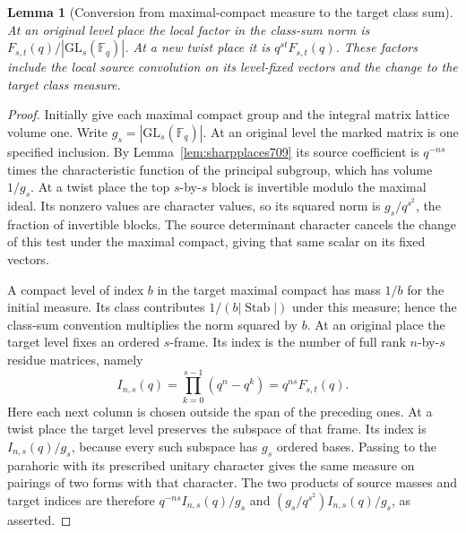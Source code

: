 \documentclass[a4paper,11pt]{article}
\newtheorem{lemma}[proposition]{Lemma}
\theoremstyle{definition}
\theoremstyle{remark}
\numberwithin{equation}{section}
\begin{document}
\begin{lemma}[Conversion from maximal-compact measure to the target class sum]
\leavevmode\label{lem:auxmass805}
At an original level place the local factor in the class-sum
norm is \(F_{s,t}(q)/|\mathrm{GL}_s(\mathbb F_q)|\).
At a new twist place it is \(q^{st}F_{s,t}(q)\).
These factors include the local source convolution on its
level-fixed vectors and the change to the target class measure.
\end{lemma}
\begin{proof}
Initially give each maximal compact group and the integral
matrix lattice volume one. Write \(g_s=|\mathrm{GL}_s(\mathbb F_q)|\).
At an original level the marked matrix is one specified
inclusion. By Lemma~\ref{lem:sharpplaces709} its source
coefficient is \(q^{-ns}\) times the characteristic function of
the principal subgroup, which has volume \(1/g_s\). At a twist
place the top \(s\)-by-\(s\) block is invertible modulo the
maximal ideal. Its nonzero values are character values, so its
squared norm is \(g_s/q^{s^2}\), the fraction of invertible
blocks. The source determinant character cancels the change of
this test under the maximal compact, giving that same scalar
on its fixed vectors.

A compact level of index \(b\) in the target maximal compact
has mass \(1/b\) for the initial measure. Its class contributes
\(1/(b|\operatorname{Stab}|)\) under this measure; hence the
class-sum convention multiplies the norm squared by \(b\).
At an original place the target level fixes an ordered
\(s\)-frame. Its index is the number of full rank \(n\)-by-\(s\)
residue matrices, namely
\[
        I_{n,s}(q)=\prod_{k=0}^{s-1}(q^n-q^k)
                      =q^{ns}F_{s,t}(q).
\]
Here each next column is chosen outside the span of the preceding
ones. At a twist place the target level preserves the subspace
of that frame. Its index is \(I_{n,s}(q)/g_s\), because every
such subspace has \(g_s\) ordered bases. Passing to the
parahoric with its prescribed unitary character gives the same
measure on pairings of two forms with that character. The two
products of source masses and target indices are therefore
\(q^{-ns} I_{n,s}(q)/g_s\) and
\((g_s/q^{s^2})I_{n,s}(q)/g_s\), as asserted.
\end{proof}
\end{document}
